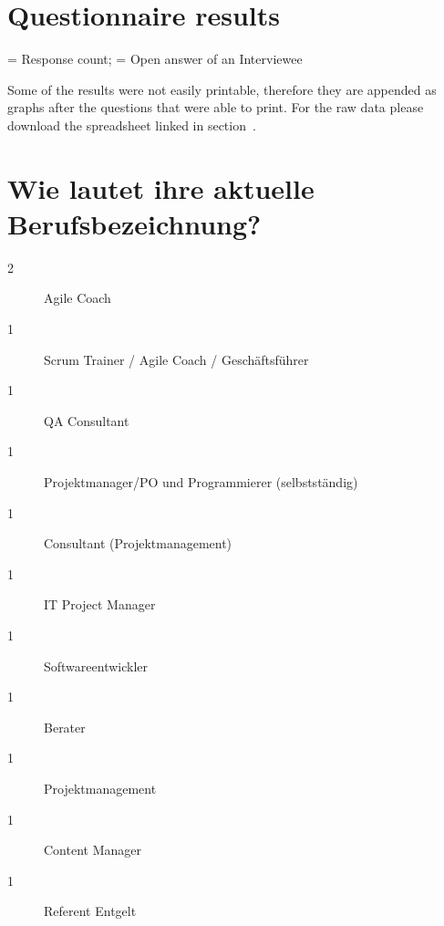 \newpage
\section{Questionnaire results}\label{app:QuestionnaireResults}
\responsecount = Response count; \openresponse = Open answer of an Interviewee

Some of the results were not easily printable, therefore they are appended as graphs after the questions that were able to print. For the raw data please download the spreadsheet linked in section~.

\section*{Wie lautet ihre aktuelle Berufsbezeichnung?}
\begin{description}
    \item[2 \responsecount] Agile Coach
    \item[1 \responsecount] Scrum Trainer / Agile Coach / Geschäftsführer
    \item[1 \responsecount] QA Consultant
    \item[1 \responsecount] Projektmanager/PO und Programmierer (selbstständig)
    \item[1 \responsecount] Consultant (Projektmanagement)
    \item[1 \responsecount] IT Project Manager
    \item[1 \responsecount] Softwareentwickler
    \item[1 \responsecount] Berater
    \item[1 \responsecount] Projektmanagement
    \item[1 \responsecount] Content Manager
    \item[1 \responsecount] Referent Entgelt
\end{description}

